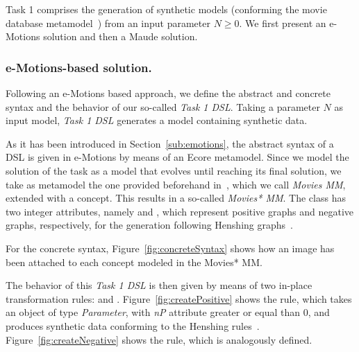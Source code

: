 
Task 1 comprises the generation of synthetic models (conforming the movie database metamodel~\cite{imdbcase}) from an input parameter $N \geq 0$. We first present an e-Motions solution and then a Maude solution. 


\subsubsection{e-Motions-based solution.}

Following an e-Motions based approach, we define the abstract and concrete syntax and the behavior of our so-called \textit{Task 1 DSL}. Taking a parameter $N$ as input model, \textit{Task 1 DSL} generates a model containing synthetic data.

As it has been introduced in Section~\ref{sub:emotions}, the abstract syntax of a DSL is given in e-Motions by means of an Ecore metamodel. Since we model the solution of the task as a model that evolves until reaching its final solution, we take as metamodel the one provided beforehand in~\cite{imdbsources}, which we call \textit{Movies MM}, extended with a  concept. This results in a so-called \textit{Movies* MM}. The class  has two integer attributes, namely  and , which represent positive graphs and negative graphs, respectively, for the generation following Henshing graphs~\cite{henshing}.

For the concrete syntax, Figure~\ref{fig:concreteSyntax} shows how an image has been attached to each concept modeled in the Movies* MM. 

The behavior of this \textit{Task 1 DSL} is then given by means of two in-place transformation rules:  and . Figure~\ref{fig:createPositive} shows the  rule, which takes an object  of type \textit{Parameter}, with \textit{nP} attribute greater or equal than $0$, and produces synthetic data conforming to the Henshing rules~\cite{henshing}. Figure~\ref{fig:createNegative} shows the  rule, which is analogously defined.

